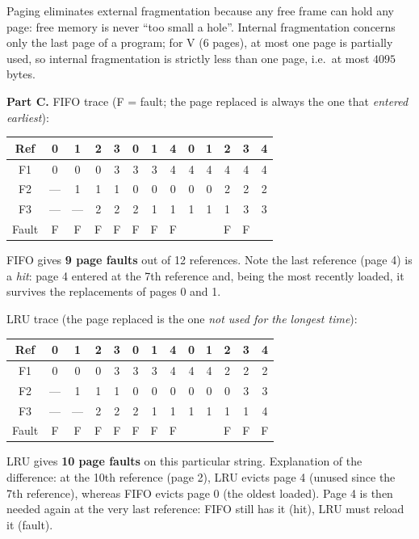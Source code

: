\documentclass[11pt]{article}
\begin{document}
Paging eliminates external fragmentation because any free frame can hold any page: free memory is never ``too small a hole''. Internal fragmentation concerns only the last page of a program; for V (6 pages), at most one page is partially used, so internal fragmentation is strictly less than one page, i.e.\ at most $4095$ bytes.

\textbf{Part C.} FIFO trace (F = fault; the page replaced is always the one that \emph{entered earliest}):

\begin{center}
\begin{tabular}{|c|c|c|c|c|c|c|c|c|c|c|c|c|}
\hline
\rowcolor{popblueL} Ref & 0 & 1 & 2 & 3 & 0 & 1 & 4 & 0 & 1 & 2 & 3 & 4 \\
\hline
F1 & 0 & 0 & 0 & 3 & 3 & 3 & 4 & 4 & 4 & 4 & 4 & 4 \\
\hline
F2 & --- & 1 & 1 & 1 & 0 & 0 & 0 & 0 & 0 & 2 & 2 & 2 \\
\hline
F3 & --- & --- & 2 & 2 & 2 & 1 & 1 & 1 & 1 & 1 & 3 & 3 \\
\hline
Fault & F & F & F & F & F & F & F & & & F & F & \\
\hline
\end{tabular}
\end{center}

FIFO gives \textbf{9 page faults} out of 12 references. Note the last reference (page 4) is a \emph{hit}: page 4 entered at the 7th reference and, being the most recently loaded, it survives the replacements of pages 0 and 1.

LRU trace (the page replaced is the one \emph{not used for the longest time}):

\begin{center}
\begin{tabular}{|c|c|c|c|c|c|c|c|c|c|c|c|c|}
\hline
\rowcolor{popblueL} Ref & 0 & 1 & 2 & 3 & 0 & 1 & 4 & 0 & 1 & 2 & 3 & 4 \\
\hline
F1 & 0 & 0 & 0 & 3 & 3 & 3 & 4 & 4 & 4 & 2 & 2 & 2 \\
\hline
F2 & --- & 1 & 1 & 1 & 0 & 0 & 0 & 0 & 0 & 0 & 3 & 3 \\
\hline
F3 & --- & --- & 2 & 2 & 2 & 1 & 1 & 1 & 1 & 1 & 1 & 4 \\
\hline
Fault & F & F & F & F & F & F & F & & & F & F & F \\
\hline
\end{tabular}
\end{center}

LRU gives \textbf{10 page faults} on this particular string. Explanation of the difference: at the 10th reference (page 2), LRU evicts page 4 (unused since the 7th reference), whereas FIFO evicts page 0 (the oldest loaded). Page 4 is then needed again at the very last reference: FIFO still has it (hit), LRU must reload it (fault).
\end{document}
